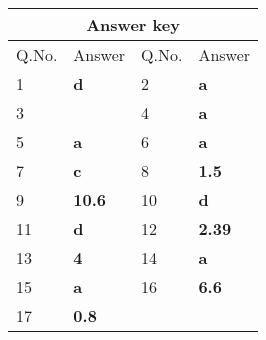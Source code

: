 \setlength\arrayrulewidth{1pt}
\begin{table}[H]
	\centering
	
	\begin{tabular}{|p{1.5cm}|p{1.5cm}||p{1.5cm}|p{1.5cm}|}
		\hline
		\multicolumn{4}{|c|}{\textbf{Answer key}}\\\hline\hline
		\rowcolor{ocrel}Q.No.&Answer&Q.No.&Answer\\\hline
		1&\textbf{d}&2&\textbf{a}\\\hline
		3&\textbf{}&4&\textbf{a}\\\hline
		5&\textbf{a}&6&\textbf{a}\\\hline
		7&\textbf{c}&8&\textbf{1.5}\\\hline
		9&\textbf{10.6}&10&\textbf{d}\\\hline
		11&\textbf{d}&12&\textbf{2.39}\\\hline
		13&\textbf{4}&14&\textbf{a}\\\hline
		15&\textbf{a}&16&\textbf{6.6}\\\hline
		17&\textbf{0.8}&&\\\hline
	\end{tabular}
\end{table}


   